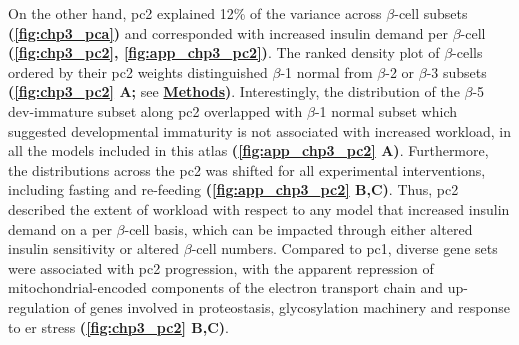 \par On the other hand, \gls{pc}2 explained 12\% of the variance across $\beta$-cell subsets \textbf{(\autoref{fig:chp3_pca})} and corresponded with increased insulin demand per $\beta$-cell \textbf{(\autoref{fig:chp3_pc2}, \autoref{fig:app_chp3_pc2})}. The ranked density plot of $\beta$-cells ordered by their \gls{pc}2 weights distinguished $\beta$-1 normal from $\beta$-2 or $\beta$-3 subsets \textbf{(\autoref{fig:chp3_pc2} A;} see \hyperref[subsubsec:met_chp3_pca]{\textbf{Methods}}\textbf{)}. Interestingly, the distribution of the $\beta$-5 dev-immature subset along \gls{pc}2 overlapped with $\beta$-1 normal subset which suggested developmental immaturity is not associated with increased workload, in all the models included in this atlas \textbf{(\autoref{fig:app_chp3_pc2} A)}. Furthermore, the distributions across the \gls{pc}2 was shifted for all experimental interventions, including fasting and re-feeding \textbf{(\autoref{fig:app_chp3_pc2} B,C)}. Thus, \gls{pc}2 described the extent of workload with respect to any model that increased insulin demand on a per $\beta$-cell basis, which can be impacted through either altered insulin sensitivity or altered $\beta$-cell numbers. Compared to \gls{pc}1, diverse gene sets were associated with \gls{pc}2 progression, with the apparent repression of mitochondrial-encoded components of the electron transport chain and up-regulation of genes involved in proteostasis, glycosylation machinery and response to \gls{er} stress \textbf{(\autoref{fig:chp3_pc2} B,C)}.\\ 

